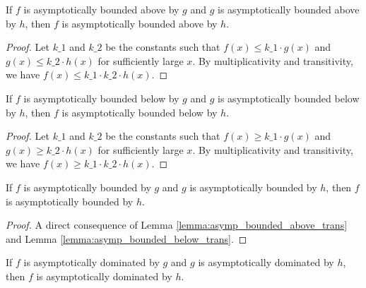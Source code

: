 \begin{lemma}
    \label{lemma:asymp_bounded_above_trans}
    \leanok
    If $f$ is asymptotically bounded above by $g$ and $g$ is asymptotically bounded above
    by $h$, then $f$ is asymptotically bounded above by $h$.
\end{lemma}

\begin{proof}
    \leanok
    Let $k\_1$ and $k\_2$ be the constants such that $f(x) \le k\_1 \cdot g(x)$ and
    $g(x) \le k\_2 \cdot h(x)$ for sufficiently large $x$. By multiplicativity and 
    transitivity, we have $f(x) \le k\_1 \cdot k\_2 \cdot h(x)$.
\end{proof}

\begin{lemma}
    \label{lemma:asymp_bounded_below_trans}
    \leanok
    If $f$ is asymptotically bounded below by $g$ and $g$ is asymptotically bounded below
    by $h$, then $f$ is asymptotically bounded below by $h$.
\end{lemma}

\begin{proof}
    \leanok
    Let $k\_1$ and $k\_2$ be the constants such that $f(x) \ge k\_1 \cdot g(x)$ and
    $g(x) \ge k\_2 \cdot h(x)$ for sufficiently large $x$. By multiplicativity and 
    transitivity, we have $f(x) \ge k\_1 \cdot k\_2 \cdot h(x)$.
\end{proof}

\begin{lemma}
    \label{lemma:asymp_bounded_trans}
    \leanok
    If $f$ is asymptotically bounded by $g$ and $g$ is asymptotically bounded 
    by $h$, then $f$ is asymptotically bounded by $h$.
\end{lemma}

\begin{proof}
    \leanok
    A direct consequence of Lemma \ref{lemma:asymp_bounded_above_trans} and Lemma
    \ref{lemma:asymp_bounded_below_trans}.
\end{proof}

\begin{lemma}
    \label{lemma:asymp_right_dom_trans}
    \leanok
    If $f$ is asymptotically dominated by $g$ and $g$ is asymptotically dominated by $h$, then 
    $f$ is asymptotically dominated by $h$.
\end{lemma}

